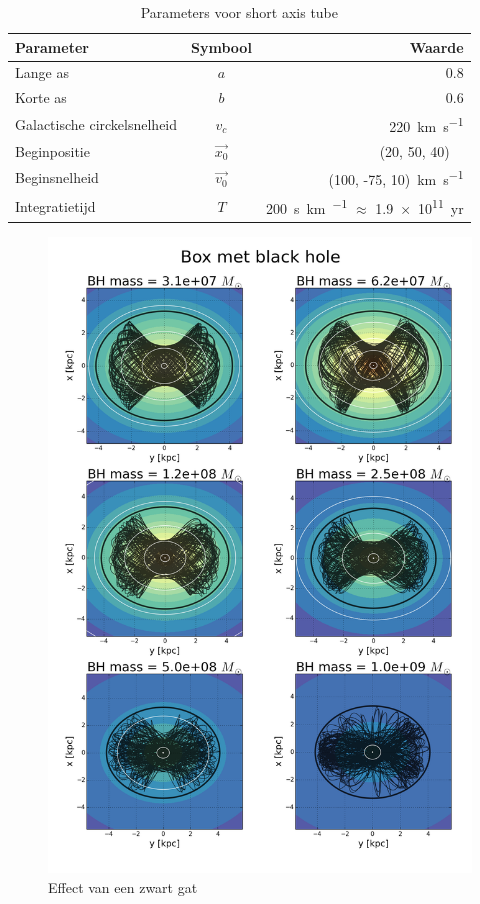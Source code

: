 \documentclass[11pt,a4paper,twoside,dutch]{article}
\begin{document}
\begin{table}[b]
\centering
\begin{tabular}{lcr}
	\hline
	\textbf{Parameter} & \textbf{Symbool} & \textbf{Waarde} \\
	\hline
	Lange as & $a$ & $0.8$\\
	Korte as & $b$ & $0.6$\\
	Galactische circkelsnelheid & $v_c$ & \SI{220}{\kilo\meter\per\second}\\
	Beginpositie & $\vec{x_0}$ & (20, 50, 40)~\si{\kilo\parsec}\\
	Beginsnelheid & $\vec{v_0}$ & (100, -75, 10)~\si{\kilo\meter\per\second}\\
	Integratietijd & $T$ & \SI{200}{\second\kilo\meter\per\parsec} $\approx$ \num{1.9e11}~yr \\
	\hline
\end{tabular}
\caption{Parameters voor short axis tube}
\label{tab:shortparam}
\end{table}

\newpage
\vfill
\begin{figure}
\centering
\includegraphics[width=1\textwidth]{img/box_bh.png}
\caption{Effect van een zwart gat}
\label{fig:bhplot}
\end{figure}
\vfill
\end{document}
